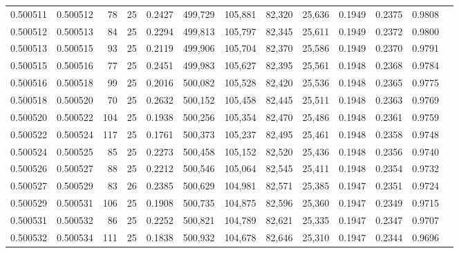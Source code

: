 \begin{tabular}{rrrrrrrrrrrrr}
0.500511 & 0.500512 &  78 &  25 &                                     0.2427 & 499,729 & 105,881 &  82,320 &  25,636 & 0.1949 & 0.2375 & 0.9808 \\
0.500512 & 0.500513 &  84 &  25 &                                     0.2294 & 499,813 & 105,797 &  82,345 &  25,611 & 0.1949 & 0.2372 & 0.9800 \\
0.500513 & 0.500515 &  93 &  25 &                                     0.2119 & 499,906 & 105,704 &  82,370 &  25,586 & 0.1949 & 0.2370 & 0.9791 \\
0.500515 & 0.500516 &  77 &  25 &                                     0.2451 & 499,983 & 105,627 &  82,395 &  25,561 & 0.1948 & 0.2368 & 0.9784 \\
0.500516 & 0.500518 &  99 &  25 &                                     0.2016 & 500,082 & 105,528 &  82,420 &  25,536 & 0.1948 & 0.2365 & 0.9775 \\
0.500518 & 0.500520 &  70 &  25 &                                     0.2632 & 500,152 & 105,458 &  82,445 &  25,511 & 0.1948 & 0.2363 & 0.9769 \\
0.500520 & 0.500522 & 104 &  25 &                                     0.1938 & 500,256 & 105,354 &  82,470 &  25,486 & 0.1948 & 0.2361 & 0.9759 \\
0.500522 & 0.500524 & 117 &  25 &                                     0.1761 & 500,373 & 105,237 &  82,495 &  25,461 & 0.1948 & 0.2358 & 0.9748 \\
0.500524 & 0.500525 &  85 &  25 &                                     0.2273 & 500,458 & 105,152 &  82,520 &  25,436 & 0.1948 & 0.2356 & 0.9740 \\
0.500526 & 0.500527 &  88 &  25 &                                     0.2212 & 500,546 & 105,064 &  82,545 &  25,411 & 0.1948 & 0.2354 & 0.9732 \\
0.500527 & 0.500529 &  83 &  26 &                                     0.2385 & 500,629 & 104,981 &  82,571 &  25,385 & 0.1947 & 0.2351 & 0.9724 \\
0.500529 & 0.500531 & 106 &  25 &                                     0.1908 & 500,735 & 104,875 &  82,596 &  25,360 & 0.1947 & 0.2349 & 0.9715 \\
0.500531 & 0.500532 &  86 &  25 &                                     0.2252 & 500,821 & 104,789 &  82,621 &  25,335 & 0.1947 & 0.2347 & 0.9707 \\
0.500532 & 0.500534 & 111 &  25 &                                     0.1838 & 500,932 & 104,678 &  82,646 &  25,310 & 0.1947 & 0.2344 & 0.9696 \\

\end{tabular}
